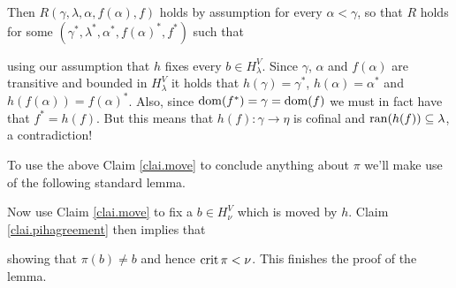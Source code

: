 \documentclass[../../main]{subfiles}
\begin{document}
{{    Then $R(\gamma,\lambda,\alpha,f(\alpha),f)$ holds by assumption for every $\alpha<\gamma$, so that $R$ holds for some $(\gamma^*,\lambda^*,\alpha^*,f(\alpha)^*,f^*)$ such that

     using our assumption that $h$ fixes every $b\in H_\lambda^V$. Since $\gamma$, $\alpha$ and $f(\alpha)$ are transitive and bounded in $H_\lambda^V$ it holds that $h(\gamma)=\gamma^*$, $h(\alpha)=\alpha^*$ and $h(f(\alpha))=f(\alpha)^*$. Also, since $\operatorname{dom}(f^*)=\gamma=\operatorname{dom}(f)$ we must in fact have that $f^*=h(f)$. But this means that $h(f)\colon\gamma\to\eta$ is cofinal and $\operatorname{ran}(h(f))\subseteq\lambda$, a contradiction!
  }
  
  To use the above Claim \ref{clai.move} to conclude anything about $\pi$ we'll make use of the following standard lemma.



  Now use Claim \ref{clai.move} to fix a $b\in H_\nu^V$ which is moved by $h$. Claim \ref{clai.pihagreement} then implies that

  showing that $\pi(b)\neq b$ and hence $\operatorname{crit}\pi<\nu$. This finishes the proof of the lemma.
}
\end{document}
